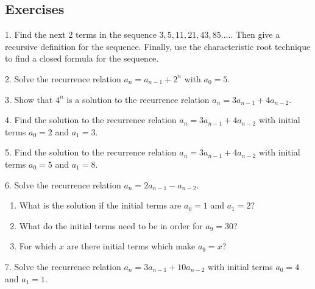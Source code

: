 \documentclass[10pt,]{book}
\theoremstyle{plain}
\theoremstyle{definition}
\theoremstyle{definition}
\theoremstyle{definition}
\numberwithin{equation}{chapter}
\begin{document}
\subsection[Exercises]{Exercises}\label{exercises-15}
\begin{exerciselist}
\item[1.]\hypertarget{exercise-161}{}
Find the next 2 terms in the sequence \(3, 5, 11, 21, 43, 85\ldots.\). Then give a recursive definition for the sequence. Finally, use the characteristic root technique to find a closed formula for the sequence.
%
\par\smallskip
\item[2.]\hypertarget{exercise-162}{}
Solve the recurrence relation \(a_n = a_{n-1} + 2^n\) with \(a_0 = 5\).
%
\par\smallskip
\item[3.]\hypertarget{exercise-163}{}
Show that \(4^n\) is a solution to the recurrence relation \(a_n = 3a_{n-1} + 4a_{n-2}\).
%
\par\smallskip
\item[4.]\hypertarget{exercise-164}{}
Find the solution to the recurrence relation \(a_n = 3a_{n-1} + 4a_{n-2}\) with initial terms \(a_0 = 2\) and \(a_1 = 3\).
%
\par\smallskip
\item[5.]\hypertarget{exercise-165}{}
Find the solution to the recurrence relation \(a_n = 3a_{n-1} + 4a_{n-2}\) with initial terms \(a_0 = 5\) and \(a_1 = 8\).
%
\par\smallskip
\item[6.]\hypertarget{exercise-166}{}
Solve the recurrence relation \(a_n = 2a_{n-1} - a_{n-2}\).
%
\leavevmode%
\begin{enumerate}[label=(\alph*)]
\item\hypertarget{li-936}{}
What is the solution if the initial terms are \(a_0 = 1\) and \(a_1 = 2\)?
%
\item\hypertarget{li-937}{}
What do the initial terms need to be in order for \(a_9 = 30\)?
%
\item\hypertarget{li-938}{}
For which \(x\) are there initial terms which make \(a_9 = x\)?
%
\end{enumerate}
\par\smallskip
\item[7.]\hypertarget{exercise-167}{}
Solve the recurrence relation \(a_n = 3a_{n-1} + 10a_{n-2}\) with initial terms \(a_0 = 4\) and \(a_1 = 1\).
%
\par\smallskip
\end{exerciselist}
\typeout{************************************************}
\typeout{************************************************}
\end{document}
